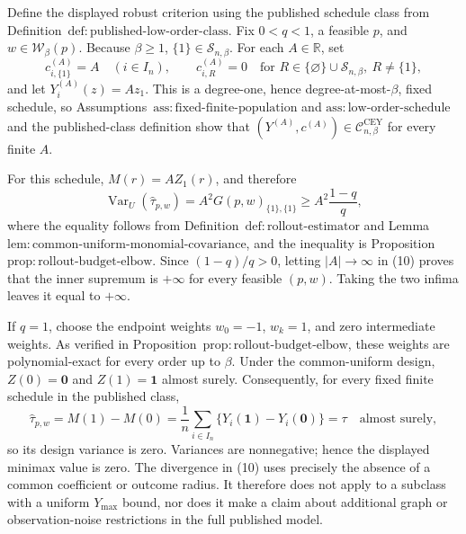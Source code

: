 Define the displayed robust criterion using the published schedule class from Definition~\(\mathrm{def{:}published\text{-}low\text{-}order\text{-}class}\).  Fix \(0<q<1\), a feasible \(p\), and \(w\in\mathcal W_\beta(p)\).  Because \(\beta\ge1\), \(\{1\}\in\mathcal S_{n,\beta}\).  For each \(A\in\mathbb R\), set
\[
c^{(A)}_{i,\{1\}}=A\quad(i\in I_n),
\qquad
c^{(A)}_{i,R}=0\quad
\text{for }R\in\{\varnothing\}\cup\mathcal S_{n,\beta},\ R\ne\{1\},
\]
and let \(Y_i^{(A)}(z)=Az_1\).  This is a degree-one, hence degree-at-most-\(\beta\), fixed schedule, so Assumptions~\(\mathrm{ass{:}fixed\text{-}finite\text{-}population}\) and \(\mathrm{ass{:}low\text{-}order\text{-}schedule}\) and the published-class definition show that \((Y^{(A)},c^{(A)})\in\mathcal C^{\mathrm{CEY}}_{n,\beta}\) for every finite \(A\).

For this schedule, \(M(r)=AZ_1(r)\), and therefore
\[
\operatorname{Var}_U(\widehat\tau_{p,w})
=A^2G(p,w)_{\{1\},\{1\}}
\ge A^2\frac{1-q}{q},
\tag{10}
\]
where the equality follows from Definition~\(\mathrm{def{:}rollout\text{-}estimator}\) and Lemma~\(\mathrm{lem{:}common\text{-}uniform\text{-}monomial\text{-}covariance}\), and the inequality is Proposition~\(\mathrm{prop{:}rollout\text{-}budget\text{-}elbow}\).  Since \((1-q)/q>0\), letting \(|A|\to\infty\) in (10) proves that the inner supremum is \(+\infty\) for every feasible \((p,w)\).  Taking the two infima leaves it equal to \(+\infty\).

If \(q=1\), choose the endpoint weights \(w_0=-1\), \(w_k=1\), and zero intermediate weights.  As verified in Proposition~\(\mathrm{prop{:}rollout\text{-}budget\text{-}elbow}\), these weights are polynomial-exact for every order up to \(\beta\).  Under the common-uniform design, \(Z(0)=\mathbf0\) and \(Z(1)=\mathbf1\) almost surely.  Consequently, for every fixed finite schedule in the published class,
\[
\widehat\tau_{p,w}=M(1)-M(0)
=\frac1n\sum_{i\in I_n}\{Y_i(\mathbf1)-Y_i(\mathbf0)\}=\tau
\quad\text{almost surely},
\]
so its design variance is zero.  Variances are nonnegative; hence the displayed minimax value is zero.  The divergence in (10) uses precisely the absence of a common coefficient or outcome radius.  It therefore does not apply to a subclass with a uniform \(Y_{\max}\) bound, nor does it make a claim about additional graph or observation-noise restrictions in the full published model.